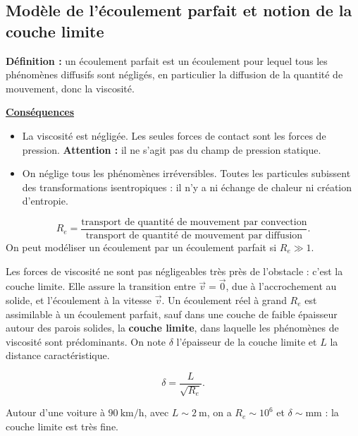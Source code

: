 \documentclass[11pt,a4paper]{article}
\newcommand{\vv}{\vec v}
\newcommand{\titr}[1]{\par\needspace{4\baselineskip}\textbf{\underline{#1}}\par}
\begin{document}
\subsection{Modèle de l'écoulement parfait et notion de la couche limite}
\textbf{Définition :} un écoulement parfait est un écoulement pour lequel tous les phénomènes diffusifs sont négligés, en particulier la diffusion de la quantité de mouvement, donc la viscosité.
\titr{Conséquences}
\begin{itemize}[beginpenalty=0,midpenalty=0,endpenalty=0]
\item La viscosité est négligée. Les seules forces de contact sont les forces de pression. \textbf{Attention :} il ne s'agit pas du champ de pression statique.
\item On néglige tous les phénomènes irréversibles. Toutes les particules subissent des transformations isentropiques : il n'y a ni échange de chaleur ni création d'entropie.
\end{itemize}
\par{}
\[R_e=\frac{\text{transport de quantité de mouvement par convection}}{\text{transport de quantité de mouvement par diffusion}}.\]
On peut modéliser un écoulement par un écoulement parfait si $R_e\gg1$.
\begin{center}\end{center}
Les forces de viscosité ne sont pas négligeables très près de l'obstacle : c'est la couche limite. Elle assure la transition entre $\vv=\vec0$, due à l'accrochement au solide, et l'écoulement à la vitesse $\vv$.
Un écoulement réel à grand $R_e$ est assimilable à un écoulement parfait, sauf dans une couche de faible épaisseur autour des parois solides, la \textbf{couche limite}, dans laquelle les phénomènes de viscosité sont prédominants.
On note $\delta$ l'épaisseur de la couche limite et $L$ la distance caractéristique.
\begin{cadre}\[\delta=\frac L{\sqrt{R_e}}.\]\end{cadre}
\begin{exemple}
Autour d'une voiture à $90\ \mathrm{km/h}$, avec $L\sim2\ \mathrm m$, on a $R_e\sim10^6$ et $\delta\sim\mathrm{mm}$ : la couche limite est très fine.
\end{exemple}
\end{document}
